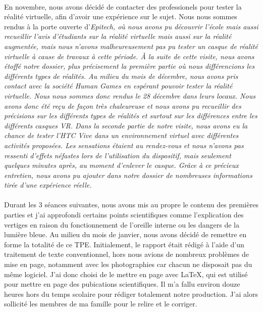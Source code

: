 \documentclass[11pt, a4paper]{article}
\begin{document}
\paragraph*{} En novembre, nous avons décidé de contacter des professionels pour tester la réalité virtuelle, afin d'avoir une expérience sur le sujet. Nous nous sommes rendus à la porte ouverte d'\it{Epitech}, où nous avons pu découvrir l'école mais aussi recueillir l'avis d'étudiants sur la réalité virtuelle mais aussi sur la réalité augmentée, mais nous n'avons malheureusement pas pu tester un casque de réalité virtuelle à cause de travaux à cette période. \`{A} la suite de cette visite, nous avons étoffé notre dossier, plus précisement la première partie où nous différencions les différents types de réalités. Au milieu du mois de décembre, nous avons pris contact avec la société \it{Human Games} en espérant pouvoir tester la réalité virtuelle. Nous nous sommes donc rendus le 28 décembre dans leurs locaux. Nous avons donc été reçu de façon très chaleureuse et nous avons pu recueillir des précisions sur les différents types de réalités et surtout sur les différences entre les différents casques VR. Dans la seconde partie de notre visite, nous avons eu la chance de tester l'HTC Vive dans un environnement virtuel avec différentes activités proposées. Les sensations étaient au rendez-vous et nous n'avons pas ressenti d'effets néfastes lors de l'utilisation du dispositif, mais seulement quelques minutes après, au moment d'enlever le casque. Grâce à ce précieux entretien, nous avons pu ajouter dans notre dossier de nombreuses informations tirée d'une expérience réelle.

\paragraph*{} Durant les 3 séances suivantes, nous avons mis au propre le contenu des premières parties et j'ai approfondi certains points scientifiques comme l'explication des vertiges en raison du fonctionnement de l'oreille interne ou les dangers de la lumière bleue. Au milieu du mois de janvier, nous avons décidé de remettre en forme la totalité de ce TPE. Initialement, le rapport était rédigé à l'aide d'un traitement de texte conventionnel, hors nous avions de nombreux problèmes de mise en page, notamment avec les photographies car chacun ne disposait pas du même logiciel. J'ai donc choisi de le mettre en page avec \LaTeX{}, qui est utilisé pour mettre en page des pubications scientifiques. Il m'a fallu environ douze heures hors du temps scolaire pour rédiger totalement notre production. J'ai alors sollicité les membres de ma famille pour le relire et le corriger.
\end{document}
